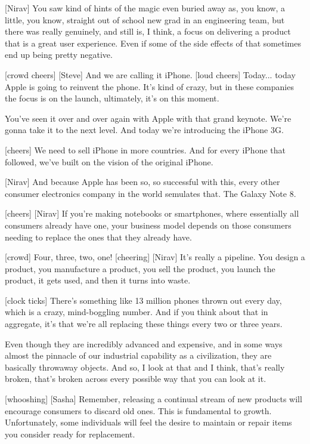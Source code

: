 \documentclass[a4paper]{article}
\begin{document}
	
	[Nirav] You saw kind of hints of the magic even buried away as, you know, a little, you know, straight out of school new grad in an engineering team, but there was really genuinely, and still is, I think, a focus on delivering a product that is a great user experience.
	Even if some of the side effects of that sometimes end up being pretty negative.
	
	
	
	[crowd cheers]
	[Steve] And we are calling it iPhone.
	[loud cheers]
	Today...
	today Apple is going to reinvent the phone.
	It's kind of crazy, but in these companies the focus is on the launch, ultimately, it's on this moment.
	
	
	You've seen it over and over again with Apple with that grand keynote.
	We're gonna take it to the next level.
	And today we're introducing the iPhone 3G.


	[cheers]
	We need to sell iPhone in more countries. And for every iPhone that followed, we've built on the vision of the original iPhone.
	
	
	[Nirav] And because Apple has been so, so successful with this, every other consumer electronics company in the world semulates that.
	The Galaxy Note 8.
	
	
	
	[cheers]
	[Nirav] If you're making notebooks or smartphones, where essentially all consumers already have one, your business model depends on those consumers needing to replace the ones that they already have.
	
	
	[crowd] Four, three, two, one!
	[cheering]
	[Nirav] It's really a pipeline. You design a product, you manufacture a product, you sell the product, you launch the product, it gets used, and then it turns into waste.
	
	
	[clock ticks]
	There's something like 13 million phones thrown out every day, which is a crazy, mind-boggling number. And if you think about that in aggregate, it's that we're all replacing these things every two or three years.
	
	Even though they are incredibly advanced and expensive, and in some ways almost the pinnacle of our industrial capability as a civilization, they are basically throwaway objects.
	And so, I look at that and I think, that's really broken, that's broken across every possible way that you can look at it.
	
	
	[whooshing]
	[Sasha] Remember, releasing a continual stream of new products will encourage consumers to discard old ones.
	This is fundamental to growth. Unfortunately, some individuals will feel the desire to maintain or repair items you consider ready for replacement.
	
\end{document}
